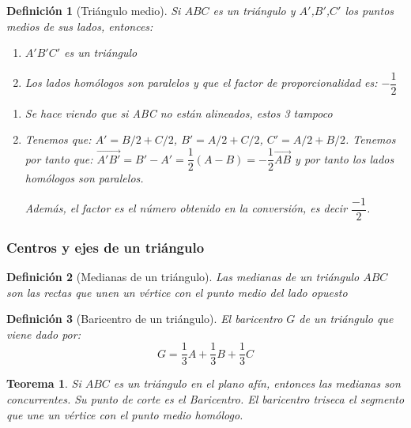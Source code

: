 \documentclass[11pt, a4paper, titlepage]{article}
\makeatletter
\renewenvironment{proof}[1][\proofname] {\vspace{-15pt}\par\pushQED{\qed}\normalfont\topsep6\p@\@plus6\p@\relax\trivlist\item[\hskip\labelsep\it#1\@addpunct{.}]\ignorespaces}{\popQED\endtrivlist\@endpefalse}
\theoremstyle{theorem-style}
\newtheorem*{nth}{Teorema}
\theoremstyle{definition-style}
\newtheorem*{ndef}{Definición}
\theoremstyle{remark-style}
\theoremstyle{example-style}
\newenvironment{nlist}
{\begin{enumerate}
\renewcommand\labelenumi{(\emph{\roman{enumi})}}}
{\end{enumerate}}
\makeatother
\begin{document}
\begin{ndef}[Triángulo medio]
	Si $ABC$ es un triángulo y $A'$,$B'$,$C'$ los puntos medios de sus lados, entonces:
	\begin{nlist}
	\item $A'B'C'$ es un triángulo
	\item Los lados homólogos son paralelos y que el factor de proporcionalidad es: $-\dfrac{1}{2}$
\end{nlist}\vspace{0.2cm}
\begin{proof}

	\begin{nlist}
	\item Se hace viendo que si ABC no están alineados, estos 3 tampoco
	\item Tenemos que: $A' = B/2 + C/2$, $B' = A/2+C/2$, $C' = A/2 + B/2$. Tenemos por tanto que: $\vec{A'B'} = B'-A' = \dfrac{1}{2}(A-B) = -\dfrac{1}{2} \vec{AB}$ y por tanto los lados homólogos son paralelos.

Además, el factor es el número obtenido en la conversión, es decir $\dfrac{-1}{2}$.
\end{nlist}
\end{proof}
\end{ndef}


\subsubsection{Centros y ejes de un triángulo}

\begin{ndef}[Medianas de un triángulo]
Las medianas de un triángulo $ABC$ son las rectas que unen un vértice con el punto medio del lado opuesto
\end{ndef}
\begin{ndef}[Baricentro de un triángulo]
	El baricentro $G$ de un triángulo que viene dado por:
	\[
	G = \dfrac{1}{3} A +  \dfrac{1}{3} B +  \dfrac{1}{3} C
	\]
\end{ndef}

\begin{nth}
	Si $ABC$ es un triángulo en el plano afín, entonces las medianas son concurrentes. Su punto de corte es el Baricentro. El baricentro triseca el segmento que une un vértice con el punto medio homólogo.


\end{nth}

\end{document}
